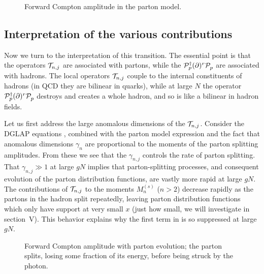 \begin{figure}%
\begin{center}
\leavevmode
{}
\end{center}
\caption{Forward Compton amplitude in the parton model.}
\end{figure}


\subsection{Interpretation of the various contributions}

Now we turn to the interpretation of this transition.  The essential
point is that the operators ${\cal T}_{n,j}$ are associated with partons,
while the $\KK_p^\dagger(\partial)^r\KK^{\vphantom \dagger}_p$ are
associated with hadrons.  The local operators ${\cal T}_{n,j}$ couple to
the internal constituents of hadrons (in QCD they are bilinear in
quarks), while at large $N$ the operator
$\KK_p^\dagger(\partial)^r\KK^{\vphantom \dagger}_p$ destroys and
creates a whole hadron, and so is like a bilinear in hadron fields.



Let us first address the large anomalous dimensions of the
${\cal T}_{n,j}$.  Consider the DGLAP equations , combined with
the parton model expression  and the fact that anomalous
dimensions $\gamma_n$ are proportional to the moments of the parton
splitting amplitudes.  From these we see that the $\gamma_{n,j}$
controls the rate of parton splitting.  That $\gamma_{n,j}\gg 1$ at
large $gN$ implies that parton-splitting processes, and consequent
evolution of the parton distribution functions, are vastly more rapid
at large $gN$.  The contributions of ${\cal T}_{n,j}$ to the moments
$M_n^{(s)}$ ($n>2$) decrease rapidly as the partons in the hadron
split repeatedly, leaving parton distribution functions which only
have support at very small $x$ (just how small, we will investigate in
section~V).  This behavior explains why the first term in
 is so suppressed at large $gN$.

\begin{figure}[h]
\begin{center} 
\leavevmode
{}
\end{center}
\caption{Forward Compton amplitude with parton evolution; the
parton splits, losing some fraction of its energy, 
before being struck by the photon.}
\end{figure}


